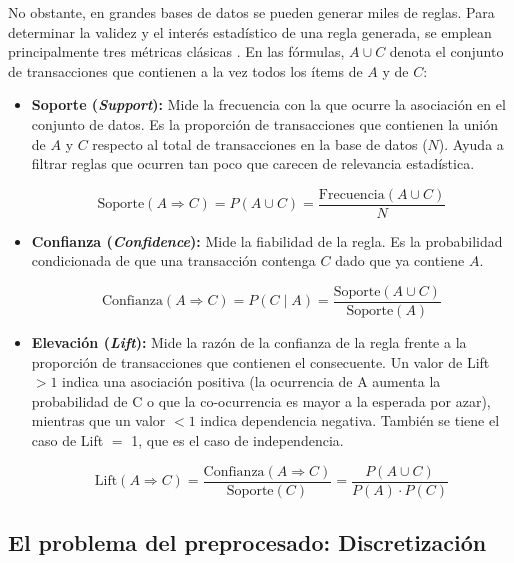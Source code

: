 \documentclass[twoside,a4paper,12pt,onecolumn,openany]{book}
\begin{document}
\vspace{0.5cm}

No obstante, en grandes bases de datos se pueden generar miles de reglas. Para determinar la validez y el interés estadístico de una regla generada, se emplean principalmente tres métricas clásicas \cite{apuntes_teoria2025, practica_asociacion}. En las fórmulas, $A \cup C$ denota el conjunto de transacciones que contienen a la vez todos los ítems de $A$ y de $C$:


\begin{itemize}
    \item \textbf{Soporte (\textit{Support}):} Mide la frecuencia con la que ocurre la asociación en el conjunto de datos. Es la proporción de transacciones que contienen la unión de $A$ y $C$ respecto al total de transacciones en la base de datos ($N$). Ayuda a filtrar reglas que ocurren tan poco que carecen de relevancia estadística.
    
    $$ \text{Soporte}(A \Rightarrow C) = P(A \cup C) = \frac{\text{Frecuencia}(A \cup C)}{N} $$
    
    \item \textbf{Confianza (\textit{Confidence}):} Mide la fiabilidad de la regla. Es la probabilidad condicionada de que una transacción contenga $C$ dado que ya contiene $A$.
    
    $$ \text{Confianza}(A \Rightarrow C) = P(C \mid A) = \frac{\text{Soporte}(A \cup C)}{\text{Soporte}(A)} $$
    
    \item \textbf{Elevación (\textit{Lift}):} Mide la razón de la confianza de la regla frente a la proporción de transacciones que contienen el consecuente. Un valor de Lift $> 1$ indica una asociación positiva (la ocurrencia de A aumenta la probabilidad de C o que la co-ocurrencia es mayor a la esperada por azar), mientras que un valor $< 1$ indica dependencia negativa. También se tiene el caso de Lift $=$ 1, que es el caso de independencia.
    
    $$ \text{Lift}(A \Rightarrow C) = \frac{\text{Confianza}(A \Rightarrow C)}{\text{Soporte}(C)} = \frac{P(A \cup C)}{P(A) \cdot P(C)} $$
    
\end{itemize}

\subsection{El problema del preprocesado: Discretización}
\end{document}
